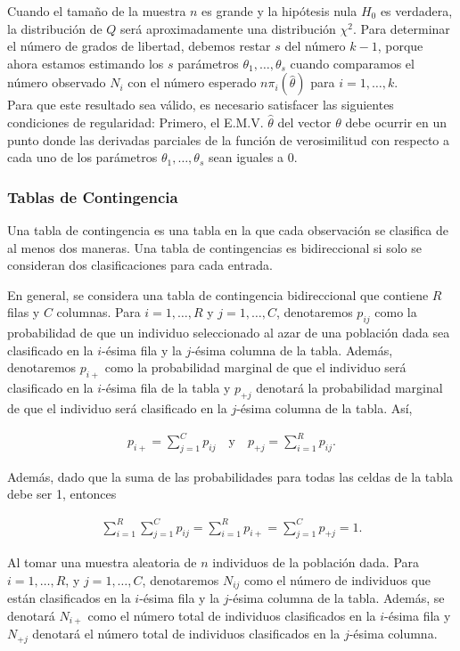 \documentclass{book}
\begin{document}
Cuando el tamaño de la muestra $n$ es grande y la hipótesis nula $H_0$ es verdadera, la distribución de $Q$ será aproximadamente una distribución $\chi^2$. Para determinar el número de grados de libertad, debemos restar $s$ del número $k - 1$, porque ahora estamos estimando los $s$ parámetros $\theta_1, \ldots, \theta_s$ cuando comparamos el número observado $N_i$ con el número esperado $n\pi_i(\hat{\theta})$ para $i = 1, \ldots, k$. \\ 
Para que este resultado sea válido, es necesario satisfacer las siguientes condiciones de regularidad: Primero, el E.M.V. $\hat{\theta}$ del vector $\theta$ debe ocurrir en un punto donde las derivadas parciales de la función de verosimilitud con respecto a cada uno de los parámetros $\theta_1, \ldots, \theta_s$ sean iguales a 0.

\subsubsection{Tablas de Contingencia}
Una tabla de contingencia es una tabla en la que cada observación se clasifica de al menos dos maneras.
Una tabla de contingencias es bidireccional si solo se consideran dos clasificaciones para cada entrada.

En general, se considera una tabla de contingencia bidireccional que contiene $R$ filas y $C$ columnas. Para $i = 1, \ldots, R$ y $j = 1, \ldots, C$, denotaremos $p_{ij}$ como la probabilidad de que un individuo seleccionado al azar de una población dada sea clasificado en la $i$-ésima fila y la $j$-ésima columna de la tabla. Además, denotaremos $p_{i+}$ como la probabilidad marginal de que el individuo será clasificado en la $i$-ésima fila de la tabla y $p_{+j}$ denotará la probabilidad marginal de que el individuo será clasificado en la $j$-ésima columna de la tabla. Así,

\begin{align}
p_{i+} = \sum_{j=1}^{C} p_{ij} \quad \text{y} \quad p_{+j} = \sum_{i=1}^{R} p_{ij}.
\end{align}

Además, dado que la suma de las probabilidades para todas las celdas de la tabla debe ser 1, entonces

\begin{align}
\sum_{i=1}^{R} \sum_{j=1}^{C} p_{ij} = \sum_{i=1}^{R} p_{i+} = \sum_{j=1}^{C} p_{+j} = 1.
\end{align}

Al tomar una muestra aleatoria de $n$ individuos de la población dada. Para $i = 1, \ldots, R$, y $j = 1, \ldots, C$, denotaremos $N_{ij}$ como el número de individuos que están clasificados en la $i$-ésima fila y la $j$-ésima columna de la tabla. Además, se denotará $N_{i+}$ como el número total de individuos clasificados en la $i$-ésima fila y $N_{+j}$ denotará el número total de individuos clasificados en la $j$-ésima columna.
\end{document}
